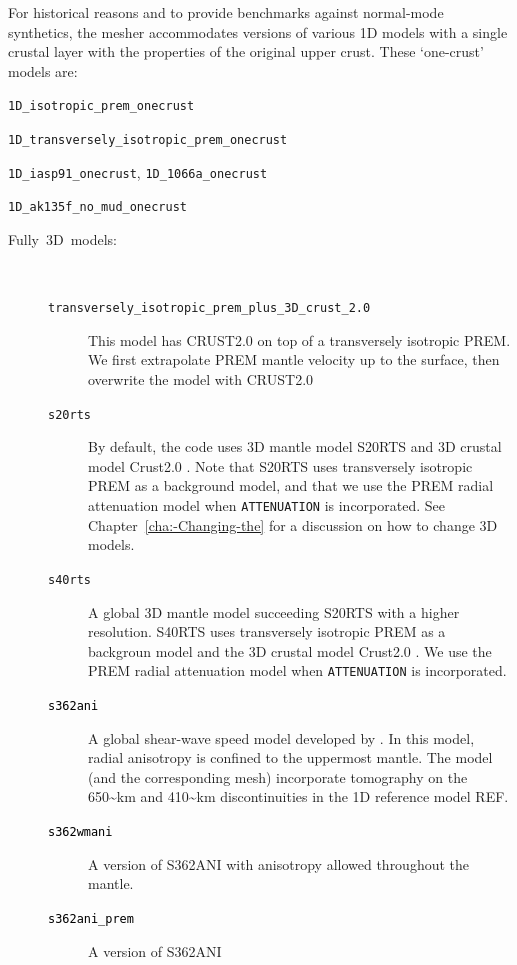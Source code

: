 \documentclass[oneside,english]{book}
\begin{document}
For historical reasons and to provide benchmarks against normal-mode
synthetics, the mesher accommodates versions of various 1D models
with a single crustal layer with the properties of the original upper
crust. These `one-crust' models are:

\texttt{1D\_isotropic\_prem\_onecrust}

\texttt{1D\_transversely\_isotropic\_prem\_onecrust}

\texttt{1D\_iasp91\_onecrust}, \texttt{1D\_1066a\_onecrust}

\texttt{1D\_ak135f\_no\_mud\_onecrust}

\begin{description}
\item [{\textmd{Fully~3D~models:}}]~

\begin{description}
\item [{\texttt{transversely\_isotropic\_prem\_plus\_3D\_crust\_2.0}}] This
model has CRUST2.0 \citep{BaLaMa00} on top of a transversely isotropic
PREM. We first extrapolate PREM mantle velocity up to the surface,
then overwrite the model with CRUST2.0
\item [{\texttt{s20rts}}] By default, the code uses 3D mantle model S20RTS
\citep{RiVaWo99} and 3D crustal model Crust2.0 \citep{BaLaMa00}.
Note that S20RTS uses transversely isotropic PREM as a background
model, and that we use the PREM radial attenuation model when \texttt{ATTENUATION}
is incorporated. See Chapter~\ref{cha:-Changing-the} for a discussion
on how to change 3D models.
\item [{\texttt{s40rts}}] A global 3D mantle model \citep{RiDeVaWo10} succeeding S20RTS
with a higher resolution.
S40RTS uses transversely isotropic PREM as a backgroun
model and the 3D crustal model Crust2.0 \citep{BaLaMa00}.
We use the PREM radial attenuation model when \texttt{ATTENUATION}
is incorporated.
\item [{\texttt{\textcolor{black}{s362ani}}}] A global shear-wave speed
model developed by \citet{KuDzEk06}. In this model, radial anisotropy
is confined to the uppermost mantle. The model (and the corresponding
mesh) incorporate tomography on the 650\textasciitilde{}km and 410\textasciitilde{}km
discontinuities in the 1D reference model REF.
\item [{\texttt{\textcolor{black}{s362wmani}}}] A version of S362ANI with
anisotropy allowed throughout the mantle.
\item [{\texttt{\textcolor{black}{s362ani\_prem}}}] A version of S362ANI

\end{description}
\end{description}
\end{document}
